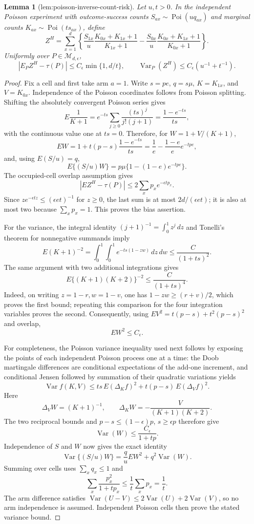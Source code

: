 \documentclass{article}
\newtheorem{lemma}{Lemma}
\begin{document}
\begin{lemma}[lem:poisson-inverse-count-risk]\label{lem:poisson-inverse-count-risk}
Let \(u,t>0\).  In the independent Poisson experiment with outcome-success counts \(S_{ax}\sim\operatorname{Poi}(u q_{ax})\) and marginal counts \(K_{ax}\sim\operatorname{Poi}(t s_{ax})\), define
\[
 Z^H=\sum_{x=1}^d\left\{\frac{S_{1x}}u\frac{K_{0x}+K_{1x}+1}{K_{1x}+1}-
 \frac{S_{0x}}u\frac{K_{0x}+K_{1x}+1}{K_{0x}+1}\right\}.
\]
Uniformly over \(P\in\mathcal M_{d,\epsilon}\),
\[
 |E_PZ^H-\tau(P)|\le C_\epsilon\min\{1,d/t\},
 \qquad
 \operatorname{Var}_P(Z^H)\le C_\epsilon(u^{-1}+t^{-1}).
\]
\end{lemma}
\begin{proof}
Fix a cell and first take arm \(a=1\).  Write \(s=pe\), \(q=s\mu\), \(K=K_{1x}\), and \(V=K_{0x}\).  Independence of the Poisson coordinates follows from Poisson splitting.  Shifting the absolutely convergent Poisson series gives
\[
 E\frac1{K+1}=e^{-ts}\sum_{j\ge0}\frac{(ts)^j}{j!(j+1)}
 =\frac{1-e^{-ts}}{ts},
\]
with the continuous value one at \(ts=0\).  Therefore, for \(W=1+V/(K+1)\),
\[
 EW=1+t(p-s)\frac{1-e^{-ts}}{ts}
 =\frac1e-\frac{1-e}{e}e^{-tpe},
\]
and, using \(E(S/u)=q\),
\[
 E\{(S/u)W\}=p\mu\{1-(1-e)e^{-tpe}\}.
\]
The occupied-cell overlap assumption gives
\[
 |E Z^H-\tau(P)|
 \le2\sum_xp_xe^{-\epsilon t p_x}.
\]
Since \(z e^{-\epsilon tz}\le(\epsilon et)^{-1}\) for \(z\ge0\), the last sum is at most \(2d/(\epsilon et)\); it is also at most two because \(\sum_xp_x=1\).  This proves the bias assertion.

For the variance, the integral identity \((j+1)^{-1}=\int_0^1z^j\,dz\) and Tonelli's theorem for nonnegative summands imply
\[
 E(K+1)^{-2}=\int_0^1\!\int_0^1e^{-ts(1-zw)}\,dz\,dw
 \le \frac{C}{(1+ts)^2}.
\]
The same argument with two additional integrations gives
\[
 E\{(K+1)(K+2)\}^{-2}\le \frac{C}{(1+ts)^4}.
\]
Indeed, on writing \(z=1-r,w=1-v\), one has \(1-zw\ge(r+v)/2\), which proves the first bound; repeating this comparison for the four integration variables proves the second.  Consequently, using \(EV^2=t(p-s)+t^2(p-s)^2\) and overlap,
\[
 EW^2\le C_\epsilon.
\]

For completeness, the Poisson variance inequality used next follows by exposing the points of each independent Poisson process one at a time: the Doob martingale differences are conditional expectations of the add-one increment, and conditional Jensen followed by summation of their quadratic variations yields
\[
 \operatorname{Var}f(K,V)\le ts\,E(\Delta_Kf)^2+t(p-s)\,E(\Delta_Vf)^2.
\]
Here
\[
 \Delta_VW=(K+1)^{-1},\qquad
 \Delta_KW=-\frac{V}{(K+1)(K+2)}.
\]
The two reciprocal bounds and \(p-s\le(1-\epsilon)p\), \(s\ge\epsilon p\) therefore give
\[
 \operatorname{Var}(W)\le \frac{C_\epsilon}{1+tp}.
\]
Independence of \(S\) and \(W\) now gives the exact identity
\[
 \operatorname{Var}\{(S/u)W\}=\frac q uEW^2+q^2\operatorname{Var}(W).
\]
Summing over cells uses \(\sum_xq_x\le1\) and
\[
 \sum_x\frac{p_x^2}{1+tp_x}\le \frac1t\sum_xp_x=\frac1t.
\]
The arm difference satisfies \(\operatorname{Var}(U-V)\le2\operatorname{Var}(U)+2\operatorname{Var}(V)\), so no arm independence is assumed.  Independent Poisson cells then prove the stated variance bound.
\end{proof}
\end{document}
